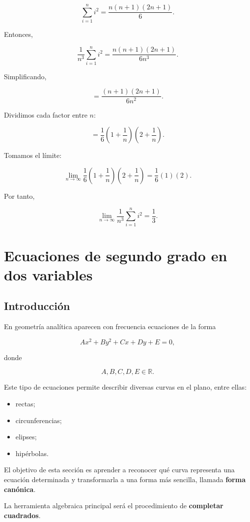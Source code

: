 \documentclass[12pt]{article}
\begin{document}
\[
\sum_{i=1}^{n}i^2
=
\frac{n(n+1)(2n+1)}6.
\]

Entonces,

\[
\frac{1}{n^3}
\sum_{i=1}^{n}i^2
=
\frac{n(n+1)(2n+1)}{6n^3}.
\]

Simplificando,

\[
=
\frac{(n+1)(2n+1)}{6n^2}.
\]

Dividimos cada factor entre \(n\):

\[
=
\frac16
\left(
1+\frac1n
\right)
\left(
2+\frac1n
\right).
\]

Tomamos el límite:

\[
\lim_{n\to\infty}
\frac16
\left(
1+\frac1n
\right)
\left(
2+\frac1n
\right)
=
\frac16(1)(2).
\]

Por tanto,

\[
\boxed{
\lim_{n\to\infty}
\frac{1}{n^3}
\sum_{i=1}^{n}i^2
=
\frac13
}.
\]

\section{Ecuaciones de segundo grado en dos variables}

\subsection*{Introducción}

En geometría analítica aparecen con frecuencia ecuaciones de la forma

\[
Ax^2+By^2+Cx+Dy+E=0,
\]

donde

\[
A,B,C,D,E\in\mathbb{R}.
\]

Este tipo de ecuaciones permite describir diversas curvas en el plano,
entre ellas:

\begin{itemize}
    \item rectas;
    \item circunferencias;
    \item elipses;
    \item hipérbolas.
\end{itemize}

El objetivo de esta sección es aprender a reconocer qué curva representa
una ecuación determinada y transformarla a una forma más sencilla,
llamada \textbf{forma canónica}.

La herramienta algebraica principal será el procedimiento de
\textbf{completar cuadrados}.
\end{document}
